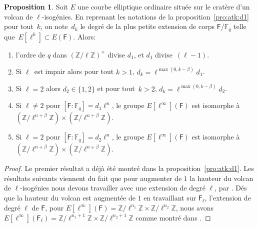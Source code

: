 \documentclass[10pt,a4paper]{book}
\theoremstyle{plain}
\theoremstyle{definition}
\theoremstyle{definition}
\theoremstyle{definition}
\theoremstyle{definition}
\newtheorem{prop}[thm]{Proposition}
\theoremstyle{definition}
\theoremstyle{remark}
\theoremstyle{remark}
\theoremstyle{definition}
\begin{document}
\begin{prop}\label{pro:clas:fro:atk}
Soit $E$ une courbe elliptique ordinaire située sur le cratère d'un 
volcan de $\ell$-isogénies. En reprenant les notations de la 
proposition~\ref{pro:atk:d1} pour tout~$k$, on note~$d_k$ le degré de la plus 
petite extension de corps $\mathsf{F}/\mathbb{F}_q$ telle que~$E[\ell^k]\subset
E(\mathsf{F})$. 
Alors:
\begin{enumerate}
\item l'ordre de $q$ dans $(\mathbb{Z}/ \ell \mathbb{Z})^\times$ divise $d_1$,
et $d_1$ divise~$(\ell-1)$.
\item Si $\ell$~est impair alors pour tout $k > 1$,
$ d_k = \ell^{\max (0, k - \beta)}d_1$.
\item Si $\ell=2$ alors $d_2 \in \{1,2\}$ et pour tout~$k > 2$,
$d_k = \ell^{\max (0, k - \beta)}d_2$.
\item Si $\ell \neq 2$ pour $[\mathsf{F}:\mathbb{F}_q]=d_1\ell^n$, le groupe $E[\ell^{\infty}](\mathsf{F})$ est isomorphe à $(\mathbb{Z}/\ell^{n+\beta} \mathbb{Z}) \times (\mathbb{Z}/\ell^{n+\beta} \mathbb{Z})$.
\item Si $\ell = 2$ pour $[\mathsf{F}:\mathbb{F}_q]=d_2\ell^n$, le groupe $E[\ell^{\infty}](\mathsf{F})$ est isomorphe à~$(\mathbb{Z}/\ell^{n+\beta} \mathbb{Z}) \times (\mathbb{Z}/\ell^{n+\beta} \mathbb{Z})$.
\end{enumerate}
\end{prop}

\begin{proof}
Le premier résultat a déjà été montré dans la proposition~\ref{pro:atk:d1}.
Les résultats suivants viennent du fait que pour augmenter de $1$ la hauteur du
volcan de $\ell$-isogénies nous devons travailler avec une extension 
de degré $\ell$, par \cite[Lemme 6.5.2]{Fouquet01}. Dés que la hauteur du 
volcan est augmentée de $1$ en travaillant sur $\mathsf{F}_{\ell}$, l'extension de
degré $\ell$ de $\mathsf{F}$, pour $E[\ell^{\infty}](\mathsf{F})= \mathbb{Z}/
\ell^{n_1} \mathbb{Z} \times \mathbb{Z}/\ell^{n_2} \mathbb{Z}$, nous avons 
$E[\ell^{\infty}](\mathsf{F}_{\ell})= \mathbb{Z}/\ell^{n_1+1} \mathbb{Z} \times
\mathbb{Z}/\ell^{n_2+1} \mathbb{Z}$ comme montré dans \cite[§5.3.1]{Ionica2010}.
\end{proof}
\end{document}
